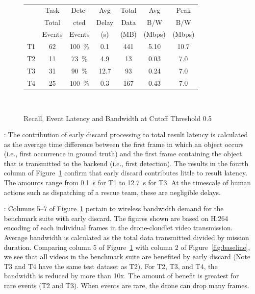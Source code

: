 \begin{figure}
\hspace{-0.15in}
\begin{tabular}{|c|c|c|c|c|c|c|}
\hline
   &Task   &Dete-       &Avg&Total&Avg&Peak\\
   &Total&cted&Delay&Data&B/W&B/W\\
   &Events&Events&(s)&(MB)&(Mbps)&(Mbps)\\ 

\hline
T1 & \phantom{0}62  & 100~\%       &  \phantom{0}0.1&\phantom{0}441  &  5.10     &   10.7  \\
\hline
T2 & \phantom{0}11  & \phantom{0}73~\%      & \phantom{0}4.9 & \phantom{00}13            &  0.03 & \phantom{0}7.0 \\ %
\hline
T3 & \phantom{0}31  & \phantom{0}90~\%  & 12.7 & \phantom{00}93  &  0.24 &  \phantom{0}7.0 \\ %
\hline
T4 & \phantom{0}25  & 100~\%       & \phantom{0}0.3 & \phantom{0}167  &  0.43 &  \phantom{0}7.0 \\
\hline
\end{tabular}\\
\caption{Recall, Event Latency and Bandwidth at Cutoff Threshold 0.5}
\label{fig:early-discard-results}
\end{figure}

:
The contribution of early discard processing to total result latency
is calculated as the average time difference between the first frame
in which an object occurs (i.e., first occurrence in ground truth) and
the first frame containing the object that is transmitted to the
backend (i.e., first detection).  The results in the fourth column of
Figure~\ref{fig:early-discard-results} confirm that early discard
contributes little to result latency.  The amounts range from 0.1~s
for T1 to 12.7~s for T3.  At the timescale of human actions
such as dispatching of a rescue team, these are negligible delays.

: Columns 5--7 of
Figure~\ref{fig:early-discard-results} pertain to wireless bandwidth demand for
the benchmark suite with early discard.  The figures shown are based on H.264
encoding of each individual frames in the drone-cloudlet video transmission.
Average bandwidth is calculated as the total data transmitted divided by
mission duration.  Comparing column 5 of Figure~\ref{fig:early-discard-results}
with column 2 of Figure~\ref{fig:baseline}, we see that all videos in the
benchmark suite are benefited by early discard (Note T3 and T4 have the same
test dataset as T2). For T2, T3, and T4, the bandwidth is reduced by more than
10x. The amount of benefit is greatest for rare events (T2 and T3).  When
events are rare, the drone can drop many frames.

